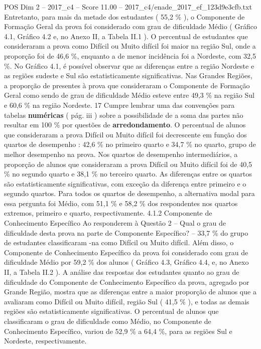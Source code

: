 \begin{textsample}{POS Dim 2 – 2017\_c4 – Score 11.00 – 2017\_c4/enade\_2017\_ef\_123d9e3cfb.txt}
Entretanto, para mais da metade dos estudantes ( 55,2 \% ), o Componente de Formação Geral da prova foi considerado com grau de dificuldade Médio ( Gráfico 4.1, Gráfico 4.2 e, no Anexo II, a Tabela II.1 ).
O percentual de estudantes que consideraram a prova como Difícil ou Muito difícil foi maior na região Sul, onde a proporção foi de 46,6 \%, enquanto a de menor incidência foi a Nordeste, com 32,5 \%.
No Gráfico 4.1, é possível observar que as diferenças entre a região Nordeste e as regiões sudeste e Sul são estatisticamente significativas.
Nas Grandes Regiões, a proporção de presentes à prova que consideraram o Componente de Formação Geral como sendo de grau de dificuldade Médio esteve entre 49,3 \% na região Sul e 60,6 \% na região Nordeste. 17 Cumpre lembrar uma das convenções para tabelas \textbf{numéricas} ( pág. iii ) sobre a possibilidade de a soma das partes não resultar em 100 \% por questões de \textbf{arredondamento}.
O percentual de alunos que consideraram a prova Difícil ou Muito difícil foi decrescente em função dos quartos de desempenho : 42,6 \% no primeiro quarto e 34,7 \% no quarto, grupo de melhor desempenho na prova.
Nos quartos de desempenho intermediários, a proporção de alunos que consideraram a prova Difícil ou Muito difícil foi de 40,5 \% no segundo quarto e 38,1 \% no terceiro quarto.
As diferenças entre os quartos são estatisticamente significativas, com exceção da diferença entre primeiro e o segundo quartos.
Para todos os quartos de desempenho, a alternativa modal para essa pergunta foi Médio, com 51,1 \% e 58,2 \% dos respondentes nos quartos extremos, primeiro e quarto, respectivamente. 4.1.2 Componente de Conhecimento Específico Ao responderem à Questão 2 – Qual o grau de dificuldade desta prova na parte de Componente Específico? – 33,7 \% do grupo de estudantes classificaram -na como Difícil ou Muito difícil.
Além disso, o Componente de Conhecimento Específico da prova foi considerado com grau de dificuldade Médio por 59,2 \% dos alunos ( Gráfico 4.3, Gráfico 4.4, e, no Anexo II, a Tabela II.2 ).
A análise das respostas dos estudantes quanto ao grau de dificuldade do Componente de Conhecimento Específico da prova, agregado por Grande Região, mostra que as diferenças entre a maior proporção de alunos que a avaliaram como Difícil ou Muito difícil, região Sul ( 41,5 \% ), e todas as demais regiões são estatisticamente significativas.
O percentual de alunos que classificaram o grau de dificuldade como Médio, no Componente de Conhecimento Específico, variou de 52,9 \% a 64,4 \%, para as regiões Sul e Nordeste, respectivamente.

\end{textsample}
